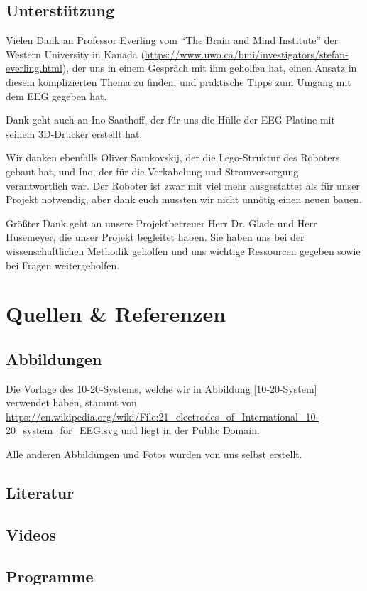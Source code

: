 \documentclass[11pt]{scrartcl}
\begin{document}
	\subsection{Unterstützung} \label{Unterstuetzung}

	Vielen Dank an Professor Everling vom \enquote{The Brain and Mind Institute} der Western University in Kanada (\href{https://www.uwo.ca/bmi/investigators/stefan-everling.html}{\url{https://www.uwo.ca/bmi/investigators/stefan-everling.html}}), der uns in einem Gespräch mit ihm geholfen hat, einen Ansatz in diesem komplizierten Thema zu finden, und praktische Tipps zum Umgang mit dem EEG gegeben hat.

	Dank geht auch an Ino Saathoff, der für uns die Hülle der EEG-Platine mit seinem 3D-Drucker erstellt hat.

	Wir danken ebenfalls Oliver Samkovskij, der die Lego-Struktur des Roboters gebaut hat, und Ino, der für die Verkabelung und Stromversorgung verantwortlich war. Der Roboter ist zwar mit viel mehr ausgestattet als für unser Projekt notwendig, aber dank euch mussten wir nicht unnötig einen neuen bauen. 

	Größter Dank geht an unsere Projektbetreuer Herr Dr. Glade und Herr Husemeyer, die unser Projekt begleitet haben. Sie haben uns bei der wissenschaftlichen Methodik geholfen und uns wichtige Ressourcen gegeben sowie bei Fragen weitergeholfen.

	\section{Quellen \& Referenzen}

	\subsection{Abbildungen}

	Die Vorlage des 10-20-Systems, welche wir in Abbildung \ref{10-20-System} verwendet haben, stammt von \url{https://en.wikipedia.org/wiki/File:21_electrodes_of_International_10-20_system_for_EEG.svg} und liegt in der Public Domain.
	
	Alle anderen Abbildungen und Fotos wurden von uns selbst erstellt.

	\subsection{Literatur}
	\printbibliography[heading=none, keyword={Literatur}, notkeyword={YTVideos}]

	\subsection{Videos}
	\printbibliography[heading=none, keyword={YTVideos}]

	\subsection{Programme}
	\printbibliography[heading=none, keyword=Programme]
\end{document}
